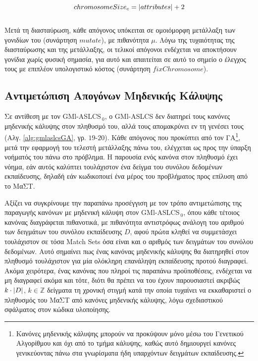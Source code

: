 \begin{equation}
chromosomeSize_c = \lvert attributes\rvert + 2
\end{equation}
\\
Μετά τη διασταύρωση, κάθε απόγονος υπόκειται σε ομοιόμορφη μετάλλαξη των γονιδίων του (συνάρτηση $mutate$), με πιθανότητα $\mu$. Λόγω της τυχαιότητας της διασταύρωσης και της μετάλλαξης, οι τελικοί απόγονοι ενδέχεται να αποκτήσουν γονίδια χωρίς φυσική σημασία, για αυτό και απαιτείται σε αυτό το σημείο ο έλεγχος τους με επιπλέον υπολογιστικό κόστος (συνάρτηση $fixChromosome$).





 

     



\subsection{Αντιμετώπιση Απογόνων Μηδενικής Κάλυψης}
\label{subsec:gmlaslcsZeroCov}
Σε αντίθεση με τον GMl-ASLCS$_{\:0}$, ο GMl-ASLCS δεν διατηρεί τους κανόνες μηδενικής κάλυψης στον πληθυσμό του, αλλά τους απομακρύνει εν τη γενέσει τους (Αλγ. \ref{alg:gmlaslcsGA}, γρ. $19$-$20$). Κάθε απόγονος που προκύπτει από τον ΓΑ\footnote{Κανόνες μηδενικής κάλυψης μπορούν να προκύψουν μόνο μέσω του Γενετικού Αλγορίθμου και όχι από το τμήμα κάλυψης, καθώς αυτό δημιουργεί κανόνες γενικεύοντας πάνω στα γνωρίσματα ήδη υπαρχόντων δειγμάτων εκπαίδευσης.}, μετά την εφαρμογή του τελεστή μετάλλαξης πάνω του, ελέγχεται ως προς την ύπαρξη νοήματός του πάνω στο πρόβλημα. Η παρουσία ενός κανόνα στον πληθυσμό έχει νόημα, εάν αυτός καλύπτει τουλάχιστον ένα δείγμα του συνόλου δεδομένων εκπαίδευσης, δηλαδή εάν κωδικοποιεί ένα μέρος του προβλήματος προς επίλυση από το ΜαΣΤ.

Αξίζει να συγκρίνουμε την παραπάνω προσέγγιση με τον τρόπο αντιμετώπισης της παραγωγής κανόνων με μηδενική κάλυψη στον GMl-ASLCS$_{\:0}$, όπου κάθε τέτοιος κανόνας διαγράφεται πιθανοτικά, με πιθανότητα αντιστρόφως ανάλογη του αριθμού των δειγμάτων του συνόλου εκπαίδευσης $D$, αφού πρώτα κληθεί να συμμετάσχει τουλάχιστον σε τόσα Match Sets όσα είναι και ο αριθμός των δειγμάτων του συνόλου δεδομένων. Αυτό σημαίνει πως ένας κανόνας μηδενικής κάλυψης θα διατηρηθεί στον πληθυσμό τουλάχιστον για μία ολόκληρη επανάληψη εκπαίδευσης προτού διαγραφεί. Ακόμα χειρότερα, ένας κανόνας που πληροί τις παραπάνω προϋποθέσεις, ενδέχεται να μη διαγραφεί ακόμα και τότε, διότι θα πρέπει να του έχουν παρουσιαστεί ακριβώς $k \cdot \lvert D\rvert$, $k \in \mathbb{Z}$ δείγματα τη χρονική στιγμή κατά την οποία τυχαίνει να εκκαθαριστεί ο πληθυσμός του ΜαΣΤ από κανόνες μηδενικής κάλυψης, λόγω σχεδιαστικού σφάλματος στον κώδικα υλοποίησης.

